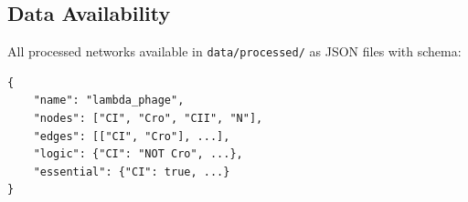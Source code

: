 \documentclass[12pt]{article}
\begin{document}
\subsection{Data Availability}
All processed networks available in \texttt{data/processed/} as JSON files with schema:
\begin{verbatim}
{
    "name": "lambda_phage",
    "nodes": ["CI", "Cro", "CII", "N"],
    "edges": [["CI", "Cro"], ...],
    "logic": {"CI": "NOT Cro", ...},
    "essential": {"CI": true, ...}
}
\end{verbatim}
\end{document}
